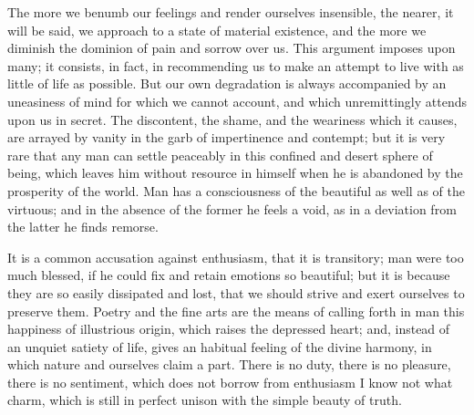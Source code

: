 The more we benumb our feelings and render ourselves insensible, the
nearer, it will be said, we approach to a state of material existence,
and the more we diminish the dominion of  pain and sorrow
over us. This argument imposes upon many; it consists, in fact, in
recommending us to make an attempt to live with as little of life as
possible. But our own degradation is always accompanied by an
uneasiness of mind for which we cannot account, and which
unremittingly attends upon us in secret. The discontent, the shame,
and the weariness which it causes, are arrayed by vanity in the garb
of impertinence and contempt; but it is very rare that any man can
settle peaceably in this confined and desert sphere of being, which
leaves him without resource in himself when he is abandoned by the
prosperity of the world. Man has a consciousness of the beautiful as
well as of the virtuous; and in the absence of the former he feels a
void, as in a deviation from the latter he finds remorse.

It is a common accusation against enthusiasm, that it is transitory;
man were too much blessed, if he could fix and retain emotions so
beautiful; but it is because they are so easily dissipated and lost,
that we should strive and exert ourselves to preserve them. Poetry and
the fine arts are the means of calling forth in man this happiness of
illustrious origin, which raises the depressed heart; and, instead of
an unquiet satiety of life, gives an habitual feeling of the divine
harmony, in which nature and ourselves claim a part. There is no duty,
there is no pleasure, there is no sentiment, which does not borrow
from enthusiasm I know not what charm, which is still in perfect
unison with the simple beauty of truth.



